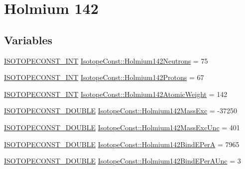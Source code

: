 \hypertarget{group___isotope_const-_holmium-_ho142}{}\section{Holmium 142}
\label{group___isotope_const-_holmium-_ho142}
\subsection*{Variables}
\begin{DoxyCompactItemize}
\item 
\mbox{\hyperlink{group___isotope_const-_macros_ga5f18360b3e99483a35c32d789e62621c}{I\+S\+O\+T\+O\+P\+E\+C\+O\+N\+S\+T\+\_\+\+I\+NT}} \mbox{\hyperlink{group___isotope_const-_holmium-_ho142_ga0404c0de604a29d12cc9645cc4f6e66f}{Isotope\+Const\+::\+Holmium142\+Neutrons}} = 75
\item 
\mbox{\hyperlink{group___isotope_const-_macros_ga5f18360b3e99483a35c32d789e62621c}{I\+S\+O\+T\+O\+P\+E\+C\+O\+N\+S\+T\+\_\+\+I\+NT}} \mbox{\hyperlink{group___isotope_const-_holmium-_ho142_ga77f1270db97f1803b10cedaeada4726e}{Isotope\+Const\+::\+Holmium142\+Protons}} = 67
\item 
\mbox{\hyperlink{group___isotope_const-_macros_ga5f18360b3e99483a35c32d789e62621c}{I\+S\+O\+T\+O\+P\+E\+C\+O\+N\+S\+T\+\_\+\+I\+NT}} \mbox{\hyperlink{group___isotope_const-_holmium-_ho142_ga9b1a48f037c5de1b7780e112f432ebfa}{Isotope\+Const\+::\+Holmium142\+Atomic\+Weight}} = 142
\item 
\mbox{\hyperlink{group___isotope_const-_macros_ga8f45a7272ce02c0b4c65c44636ed719a}{I\+S\+O\+T\+O\+P\+E\+C\+O\+N\+S\+T\+\_\+\+D\+O\+U\+B\+LE}} \mbox{\hyperlink{group___isotope_const-_holmium-_ho142_ga6356165ee52eb499b83b76dc661aa02a}{Isotope\+Const\+::\+Holmium142\+Mass\+Exc}} = -\/37250
\item 
\mbox{\hyperlink{group___isotope_const-_macros_ga8f45a7272ce02c0b4c65c44636ed719a}{I\+S\+O\+T\+O\+P\+E\+C\+O\+N\+S\+T\+\_\+\+D\+O\+U\+B\+LE}} \mbox{\hyperlink{group___isotope_const-_holmium-_ho142_gad9bf8966328422146224f802668b5f8c}{Isotope\+Const\+::\+Holmium142\+Mass\+Exc\+Unc}} = 401
\item 
\mbox{\hyperlink{group___isotope_const-_macros_ga8f45a7272ce02c0b4c65c44636ed719a}{I\+S\+O\+T\+O\+P\+E\+C\+O\+N\+S\+T\+\_\+\+D\+O\+U\+B\+LE}} \mbox{\hyperlink{group___isotope_const-_holmium-_ho142_gae2498305f970f9ea2b0aec596619070f}{Isotope\+Const\+::\+Holmium142\+Bind\+E\+PerA}} = 7965
\item 
\mbox{\hyperlink{group___isotope_const-_macros_ga8f45a7272ce02c0b4c65c44636ed719a}{I\+S\+O\+T\+O\+P\+E\+C\+O\+N\+S\+T\+\_\+\+D\+O\+U\+B\+LE}} \mbox{\hyperlink{group___isotope_const-_holmium-_ho142_ga382fbaa1d5544eceb0d22f9a0b16186b}{Isotope\+Const\+::\+Holmium142\+Bind\+E\+Per\+A\+Unc}} = 3

\end{DoxyCompactItemize}
